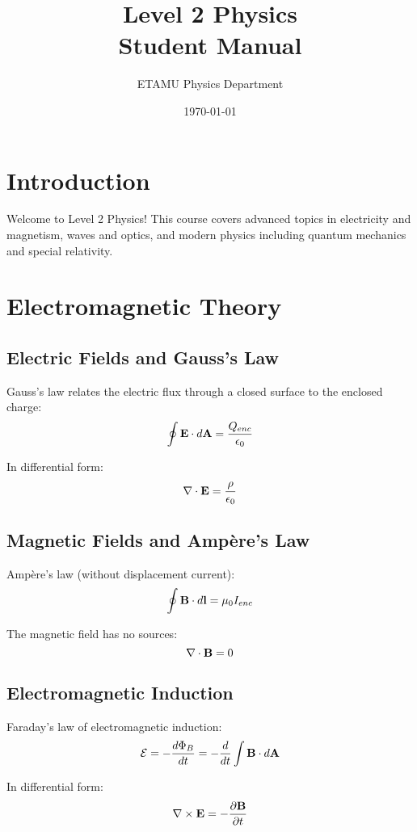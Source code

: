 \documentclass[11pt]{book}
\title{Level 2 Physics\\Student Manual}
\author{ETAMU Physics Department}
\date{\today}
\begin{document}
\frontmatter
\maketitle

\tableofcontents

\chapter{Introduction}

Welcome to Level 2 Physics! This course covers advanced topics in electricity and magnetism, waves and optics, and modern physics including quantum mechanics and special relativity.

\mainmatter

\chapter{Electromagnetic Theory}

\section{Electric Fields and Gauss's Law}

Gauss's law relates the electric flux through a closed surface to the enclosed charge:
\[ \oint \mathbf{E} \cdot d\mathbf{A} = \frac{Q_{enc}}{\epsilon_0} \]

In differential form:
\[ \nabla \cdot \mathbf{E} = \frac{\rho}{\epsilon_0} \]

\section{Magnetic Fields and Ampère's Law}

Ampère's law (without displacement current):
\[ \oint \mathbf{B} \cdot d\mathbf{l} = \mu_0 I_{enc} \]

The magnetic field has no sources:
\[ \nabla \cdot \mathbf{B} = 0 \]

\section{Electromagnetic Induction}

Faraday's law of electromagnetic induction:
\[ \mathcal{E} = -\frac{d\Phi_B}{dt} = -\frac{d}{dt}\int \mathbf{B} \cdot d\mathbf{A} \]

In differential form:
\[ \nabla \times \mathbf{E} = -\frac{\partial \mathbf{B}}{\partial t} \]
\end{document}
